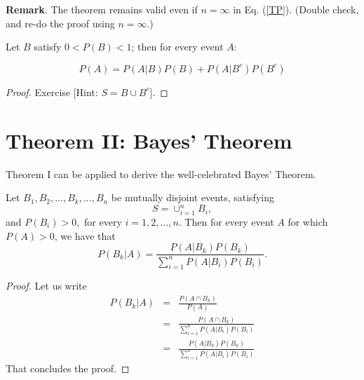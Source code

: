 \documentclass[notes=show,handout]{beamer}\usepackage[]{graphicx}\usepackage[]{color}
\newcommand{\bea}{\begin{eqnarray}}
\newcommand{\eea}{\end{eqnarray}}
\newcommand{\nn}{\nonumber}
\begin{document}
\begin{frame}{\secname}
  \textbf{Remark}. The theorem remains valid even if $n=\infty$ in Eq. (\ref{TP}). (Double check, and re-do the proof using $n=\infty$.)
  \begin{corollary}
  Let $B$ satisfy $0<P(B)<1$; then for every event $A$:

  \begin{equation*}
  P(A)=P(A\vert B)P(B)+P(A\vert B^c) P(B^c)
  \end{equation*}

  \end{corollary}

  \begin{proof}
  Exercise [Hint: $S=B \cup B^c$].
  \end{proof}
\end{frame}


\section{Theorem II: Bayes' Theorem}


\begin{frame}{\secname}
  Theorem I can be applied to derive the well-celebrated Bayes' Theorem.
  \begin{theorem} 
  \label{Th:Bayes}
  Let $B_1,B_2,...,B_k,...,B_n$ be mutually disjoint events, satisfying
  $$S=\cup_{i=1}^{n} B_i,$$ and $P(B_i)>0,$
  for every $i=1,2,...,n$. Then for every event $A$ for which $P(A)>0$, we have that
  \begin{equation}
  \label{Bayes}
  P(B_k\vert A)=\frac{P(A\vert B_k)P(B_k)}{\sum_{i=1}^n P(A\vert B_i) P(B_i)}.
  \end{equation}
  \end{theorem}
\end{frame}

\begin{frame}{\secname}
  \begin{proof}
  Let us write
  \bea
  P(B_k\vert A)&=&\frac{P(A\cap B_k)}{P(A)} \nn \\
  &=&\frac{P(A\cap B_k)}{\sum_{i=1}^n P(A\vert B_i) P(B_i)}\nn \\
  &=&\frac{P(A\vert B_k)P(B_k)}{\sum_{i=1}^n P(A\vert B_i) P(B_i)} \nn
  \eea
  That concludes the proof.
  \end{proof}
\end{frame}
\end{document}

